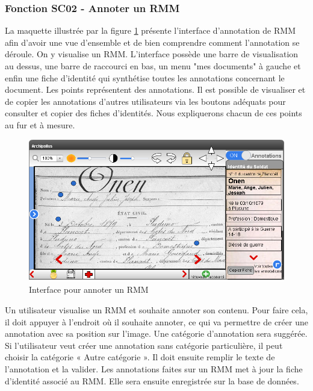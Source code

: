 \documentclass[a4paper]{article}
\begin{document}
\subsubsection{Fonction SC02 - Annoter un RMM}

La maquette illustrée par la figure \ref{fig:annotation} présente l'interface d'annotation de RMM afin d'avoir une vue d'ensemble et de bien comprendre comment l'annotation se déroule. On y visualise un RMM. L'interface possède une barre de visualisation au dessus, une barre de raccourci en bas, un menu "mes documents" à gauche et enfin une fiche d'identité qui synthétise toutes les annotations concernant le document. Les points représentent des annotations. Il est possible de visualiser et de copier les annotations d'autres utilisateurs via les boutons adéquats pour consulter et copier des fiches d'identités. Nous expliquerons chacun de ces points au fur et à mesure.

\begin{figure}[H]
\centering
\includegraphics[width=\textwidth]{annotation.png}
\caption{Interface pour annoter un RMM}
\label{fig:annotation}
\end{figure}

Un utilisateur visualise un RMM et souhaite annoter son contenu. Pour faire cela, il doit appuyer à l’endroit où il souhaite annoter, ce qui va permettre de créer une annotation avec sa position sur l’image. Une catégorie d’annotation sera suggérée. Si l’utilisateur veut créer une annotation sans catégorie particulière, il peut choisir la catégorie « Autre catégorie ». Il doit ensuite remplir le texte de l’annotation et la valider. Les annotations faites sur un RMM met à jour la fiche d’identité associé au RMM. Elle sera ensuite enregistrée sur la base de données.\\
\end{document}
